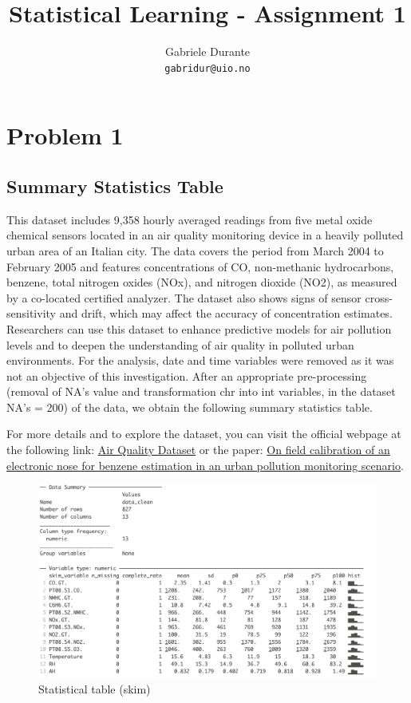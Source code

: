 \documentclass{article}
\title{Statistical Learning - Assignment 1}
\author{Gabriele Durante \\ \texttt{gabridur@uio.no}}
\begin{document}
\maketitle
\newpage
\section{Problem 1}
\subsection{Summary Statistics Table}
This dataset includes 9,358 hourly averaged readings from five metal oxide chemical sensors located in an air quality monitoring device in a heavily polluted urban area of an Italian city. The data covers the period from March 2004 to February 2005 and features concentrations of CO, non-methanic hydrocarbons, benzene, total nitrogen oxides (NOx), and nitrogen dioxide (NO2), as measured by a co-located certified analyzer. The dataset also shows signs of sensor cross-sensitivity and drift, which may affect the accuracy of concentration estimates.
Researchers can use this dataset to enhance predictive models for air pollution levels and to deepen the understanding of air quality in polluted urban environments.
For the analysis, date and time variables were removed as it was not an objective of this investigation.
After an appropriate pre-processing (removal of NA's value and transformation chr into int variables, in the dataset NA's = 200) of the data, we obtain the following summary statistics table.

For more details and to explore the dataset, you can visit the official webpage at the following link: \href{https://archive.ics.uci.edu/dataset/360/air+quality}{Air Quality Dataset} or the paper: \href{https://www.semanticscholar.org/paper/On-field-calibration-of-an-electronic-nose-for-in-Vito-Massera/a90a54a39ff934772df57771a0012981f355949d}{On field calibration of an electronic nose for benzene estimation in an urban pollution monitoring scenario}.
\begin{figure}[h!]
   \centering
   \includegraphics[width=\linewidth]{images/summary_tab2.png}
   \caption{Statistical table (skim)}
   \label{fig:fig1}
\end{figure}
\end{document}
